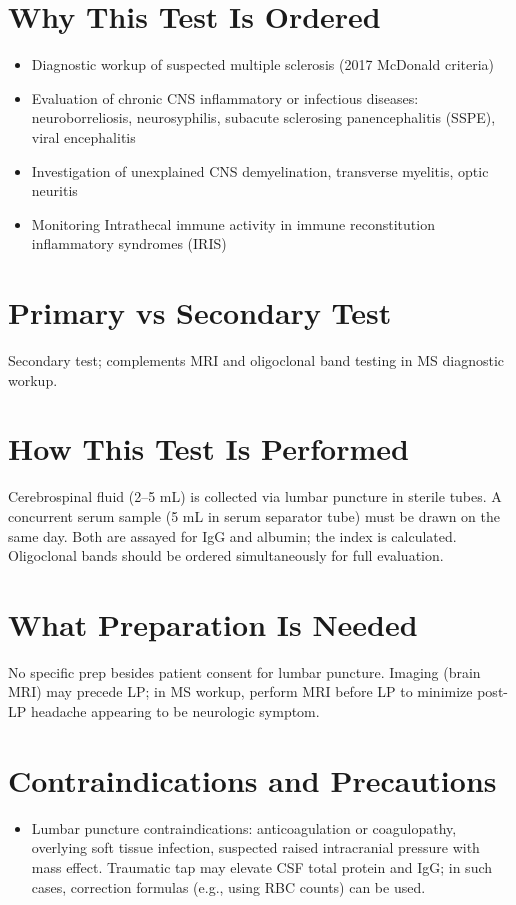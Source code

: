 \section*{Why This Test Is Ordered}
\begin{itemize}
  \item Diagnostic workup of suspected multiple sclerosis (2017 McDonald criteria) \cite{thompson2018diagnosis}
  \item Evaluation of chronic CNS inflammatory or infectious diseases: neuroborreliosis, neurosyphilis, subacute sclerosing panencephalitis (SSPE), viral encephalitis
  \item Investigation of unexplained CNS demyelination, transverse myelitis, optic neuritis
  \item Monitoring Intrathecal immune activity in immune reconstitution inflammatory syndromes (IRIS)
\end{itemize}

\section*{Primary vs Secondary Test}
Secondary test; complements MRI and oligoclonal band testing in MS diagnostic workup.

\section*{How This Test Is Performed}
Cerebrospinal fluid (2--5 mL) is collected via lumbar puncture in sterile tubes. A concurrent serum sample (5 mL in serum separator tube) must be drawn on the same day. Both are assayed for IgG and albumin; the index is calculated. Oligoclonal bands should be ordered simultaneously for full evaluation.

\section*{What Preparation Is Needed}
No specific prep besides patient consent for lumbar puncture. Imaging (brain MRI) may precede LP; in MS workup, perform MRI before LP to minimize post-LP headache appearing to be neurologic symptom.

\section*{Contraindications and Precautions}
\begin{itemize}
  \item Lumbar puncture contraindications: anticoagulation or coagulopathy, overlying soft tissue infection, suspected raised intracranial pressure with mass effect. Traumatic tap may elevate CSF total protein and IgG; in such cases, correction formulas (e.g., using RBC counts) can be used.
\end{itemize}
